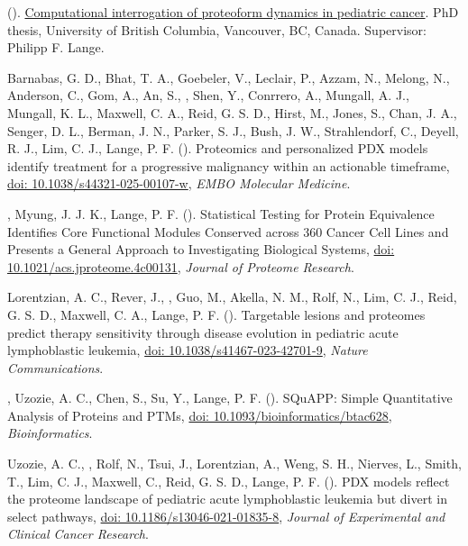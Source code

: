 \documentclass[line]{resonancecv}
\begin{document}
\begin{resume}
\begin{publist}
\item {} (). \href{https://open.library.ubc.ca/cIRcle/collections/ubctheses/24/items/1.0448334}{Computational interrogation of proteoform dynamics in pediatric cancer}. PhD thesis, University of British Columbia, Vancouver, BC, Canada. Supervisor: Philipp F. Lange.
\item Barnabas, G. D., Bhat, T. A., Goebeler, V., Leclair, P., Azzam, N., Melong, N., Anderson, C., Gom, A., An, S., , Shen, Y., Conrrero, A., Mungall, A. J., Mungall, K. L., Maxwell, C. A., Reid, G. S. D., Hirst, M., Jones, S., Chan, J. A., Senger, D. L., Berman, J. N., Parker, S. J., Bush, J. W., Strahlendorf, C., Deyell, R. J., Lim, C. J., Lange, P. F. (). Proteomics and personalized PDX models identify treatment for a progressive malignancy within an actionable timeframe, \href{https://pmc.ncbi.nlm.nih.gov/articles/PMC11982353/}{doi: 10.1038/s44321-025-00107-w}, \emph{EMBO Molecular Medicine}.
\item {}, Myung, J. J. K., Lange, P. F. (). Statistical Testing for Protein Equivalence Identifies Core Functional Modules Conserved across 360 Cancer Cell Lines and Presents a General Approach to Investigating Biological Systems, \href{https://doi.org/10.1021/acs.jproteome.4c00131}{doi: 10.1021/acs.jproteome.4c00131}, \emph{Journal of Proteome Research}.
\item Lorentzian, A. C., Rever, J., , Guo, M., Akella, N. M., Rolf, N., Lim, C. J., Reid, G. S. D., Maxwell, C. A., Lange, P. F. (). Targetable lesions and proteomes predict therapy sensitivity through disease evolution in pediatric acute lymphoblastic leukemia, \href{https://doi.org/10.1038/s41467-023-42701-9}{doi: 10.1038/s41467-023-42701-9}, \emph{Nature Communications}.
\item {}, Uzozie, A. C., Chen, S., Su, Y., Lange, P. F. (). SQuAPP: Simple Quantitative Analysis of Proteins and PTMs, \href{https://doi.org/10.1093/bioinformatics/btac628}{doi: 10.1093/bioinformatics/btac628}, \emph{Bioinformatics}.
\item Uzozie, A. C., , Rolf, N., Tsui, J., Lorentzian, A., Weng, S. H., Nierves, L., Smith, T., Lim, C. J., Maxwell, C., Reid, G. S. D., Lange, P. F. (). PDX models reflect the proteome landscape of pediatric acute lymphoblastic leukemia but divert in select pathways, \href{https://dx.doi.org/10.1186\%2Fs13046-021-01835-8}{doi: 10.1186/s13046-021-01835-8}, \emph{Journal of Experimental and Clinical Cancer Research}.

\end{publist}
\end{resume}
\end{document}
